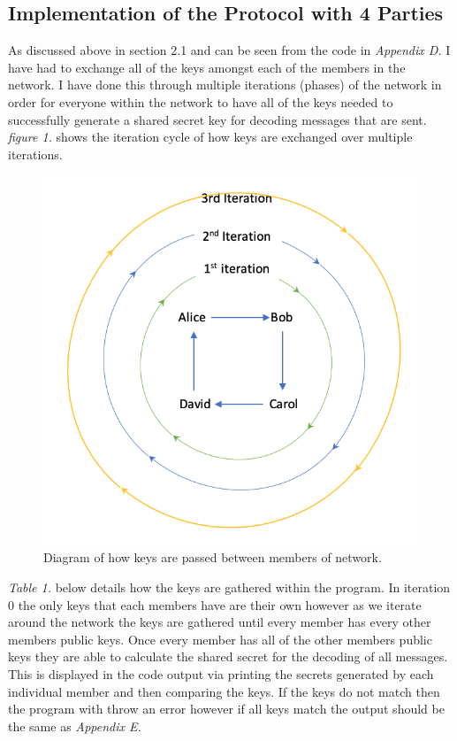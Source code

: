 \documentclass[a4paper, twoside, 11pt]{article}
\begin{document}
\subsection{Implementation of the Protocol with 4 Parties}
As discussed above in section 2.1 and can be seen from the code in \textit{Appendix D. } I have had to exchange all of the keys amongst each of the members in the network. I have done this through multiple iterations (phases) of the network in order
for everyone within the network to have all of the keys needed to successfully generate a shared secret key for decoding messages that are sent. 
\textit{figure 1.} shows the iteration cycle of how keys are exchanged over multiple iterations.

\begin{figure}[H]
	\centering
	\includegraphics[scale=0.8]{Images/KeyIteration.png}
  \caption{Diagram of how keys are passed between members of network.}
  \setlength{\belowcaptionskip}{0pt}
\end{figure}


\textit{Table 1.} below details how the keys are gathered within the program. In iteration 0 the only keys that each
members have are their own however as we iterate around the network the keys are gathered until every member
has every other members public keys. Once every member has all of the other members public keys they are able to calculate the shared secret for the decoding of all messages. This is displayed in the code output via printing the secrets generated by each individual member and then comparing the keys. If the keys do not match then the program with throw an error however if all keys match the output should be the same as \textit{Appendix E.}
\end{document}

